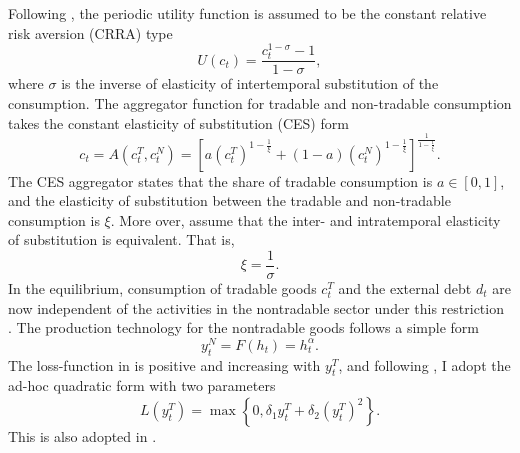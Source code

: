 Following \citet{Na-18}, the periodic utility function is assumed to be the constant relative risk aversion (CRRA) type
\begin{equation}
    \label{eq:CRRA-utility}
    U(c_t) = \frac{c_t^{1-\sigma} - 1}{1 - \sigma},
\end{equation}
where $\sigma$ is the inverse of elasticity of intertemporal substitution of the consumption.
The aggregator function for tradable and non-tradable consumption takes the constant elasticity of substitution (CES) form
\begin{equation}
    \label{eq:aggregator-function}
    c_t = A(c^T_t, c^N_t) =
        \left[ a \left( c^T_t \right)^{1- \frac{1}{\xi}} +
            (1 - a) \left( c^N_t \right)^{1- \frac{1}{\xi}}
        \right]^{\frac{1}{1 - \frac{1}{\xi}}}.
\end{equation}
The CES aggregator states that the share of tradable consumption is $a \in [0,1]$, and the elasticity of substitution between the tradable and non-tradable consumption is $\xi$. More over, assume that the inter- and intratemporal elasticity of substitution is equivalent. That is,
\begin{equation}
    \xi = \frac{1}{\sigma}.
\end{equation}
In the equilibrium, consumption of tradable goods $c^T_t$ and the external debt $d_t$ are now independent of the activities in the nontradable sector under this restriction \citep*[See][Chapter 8.5]{Uribe-Schmitt-Grohe-textbook}.
The production technology for the nontradable goods follows a simple form
\begin{equation}
    \label{eq:production-function}
    y^N_t = F(h_t) = h_t ^\alpha.
\end{equation}
The loss-function in  is positive and increasing with $y^T_t$, and following \citet{Chatterjee-12}, I adopt the ad-hoc quadratic form with two parameters
\begin{equation}
    L(y^T_t) = \max \left\{
        0, \delta_1 y^T_t + \delta_2 \left( y^T_t \right)^2
     \right\}.
\end{equation}
This is also adopted in \citet{Na-18}.